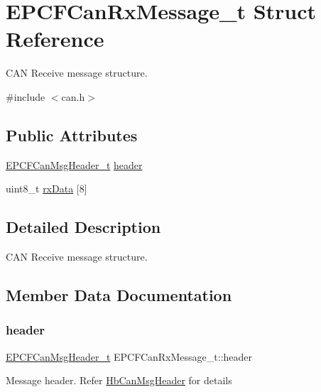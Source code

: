 \hypertarget{structEPCFCanRxMessage__t}{}\section{E\+P\+C\+F\+Can\+Rx\+Message\+\_\+t Struct Reference}
\label{structEPCFCanRxMessage__t}


C\+AN Receive message structure.  




{\ttfamily \#include $<$can.\+h$>$}

\subsection*{Public Attributes}
\begin{DoxyCompactItemize}
\item 
\mbox{\hyperlink{structEPCFCanMsgHeader__t}{E\+P\+C\+F\+Can\+Msg\+Header\+\_\+t}} \mbox{\hyperlink{structEPCFCanRxMessage__t_ada07058e5889bc451d0db53b8d45efab}{header}}
\item 
uint8\+\_\+t \mbox{\hyperlink{structEPCFCanRxMessage__t_a354af6f0250020235dd35d579f35d260}{rx\+Data}} \mbox{[}8\mbox{]}
\end{DoxyCompactItemize}


\subsection{Detailed Description}
C\+AN Receive message structure. 

\subsection{Member Data Documentation}
\mbox{\label{structEPCFCanRxMessage__t_ada07058e5889bc451d0db53b8d45efab}} 
\subsubsection{\texorpdfstring{header}{header}}
{\footnotesize\ttfamily \mbox{\hyperlink{structEPCFCanMsgHeader__t}{E\+P\+C\+F\+Can\+Msg\+Header\+\_\+t}} E\+P\+C\+F\+Can\+Rx\+Message\+\_\+t\+::header}

Message header. Refer \mbox{\hyperlink{}{Hb\+Can\+Msg\+Header}} for details \mbox{\label{structEPCFCanRxMessage__t_a354af6f0250020235dd35d579f35d260}} 
